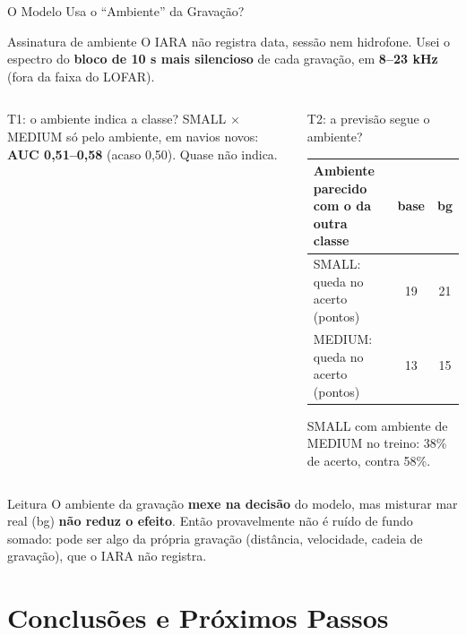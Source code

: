 \documentclass[aspectratio=169]{beamer}
\begin{document}
\begin{frame}{O Modelo Usa o ``Ambiente'' da Gravação?}
    \footnotesize
    \begin{block}{\small Assinatura de ambiente}
        \scriptsize
        O IARA não registra data, sessão nem hidrofone. Usei o espectro do \textbf{bloco de 10 s mais silencioso} de cada gravação, em \textbf{8--23 kHz} (fora da faixa do LOFAR).
    \end{block}
    \begin{columns}[t]
        \begin{block}{\small T1: o ambiente indica a classe?}
            \scriptsize
            SMALL $\times$ MEDIUM só pelo ambiente, em navios novos: \textbf{AUC 0,51--0,58} (acaso 0,50). Quase não indica.
        \end{block}
        \begin{block}{\small T2: a previsão segue o ambiente?}
            \scriptsize
            \centering
            \setlength{\tabcolsep}{3pt}
            \begin{tabular}{lcc}
            \toprule
            Ambiente parecido com o da outra classe & base & bg \\
            \midrule
            SMALL: queda no acerto (pontos) & 19 & 21 \\
            MEDIUM: queda no acerto (pontos) & 13 & 15 \\
            \bottomrule
            \end{tabular}

            {\tiny SMALL com ambiente de MEDIUM no treino: 38\% de acerto, contra 58\%.\par}
        \end{block}
    \end{columns}
    \vspace{0.1cm}
    \begin{alertblock}{Leitura}
        \scriptsize
        O ambiente da gravação \textbf{mexe na decisão} do modelo, mas misturar mar real (bg) \textbf{não reduz o efeito}. Então provavelmente não é ruído de fundo somado: pode ser algo da própria gravação (distância, velocidade, cadeia de gravação), que o IARA não registra.
    \end{alertblock}
\end{frame}

\section{Conclusões e Próximos Passos}
\end{document}

